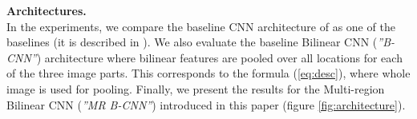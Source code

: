 



\indent\textbf{Architectures.}\\
In the experiments, we compare the baseline CNN architecture of \citep{yi2014deep} as one of the baselines (it is described in ).
We also evaluate the baseline Bilinear CNN (\textit{''B-CNN''}) architecture where bilinear features are pooled over all locations for each of the three image parts. This corresponds to the formula (\ref{eq:desc}), where whole image is used for pooling.
Finally, we present the results for the Multi-region Bilinear CNN (\textit{''MR B-CNN''}) introduced in this paper (figure \ref{fig:architecture}).

